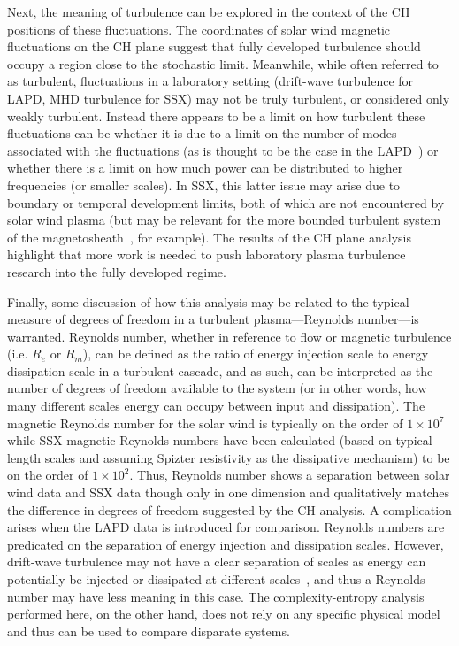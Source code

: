 \documentclass[aps,prx,twocolumn,secnumarabic,nobalancelastpage,amsmath,amssymb,
nofootinbib]{revtex4-1}
\begin{document}
Next, the meaning of turbulence can be explored in the context of the CH positions of these fluctuations. The coordinates of solar wind magnetic fluctuations on the CH plane suggest that fully developed turbulence should occupy a region close to the stochastic limit. Meanwhile, while often referred to as turbulent, fluctuations in a laboratory setting (drift-wave turbulence for LAPD, MHD turbulence for SSX) may not be truly turbulent, or considered only weakly turbulent. Instead there appears to be a limit on how turbulent these fluctuations can be whether it is due to a limit on the number of modes associated with the fluctuations (as is thought to be the case in the LAPD~\cite{maggs2013}) or whether there is a limit on how much power can be distributed to higher frequencies (or smaller scales). In SSX, this latter issue may arise due to boundary or temporal development limits, both of which are not encountered by solar wind plasma (but may be relevant for the more bounded turbulent system of the magnetosheath~\cite{SahraouiPRL2006,YordanovaPRL2008}, for example). The results of the CH plane analysis highlight that more work is needed to push laboratory plasma turbulence research into the fully developed regime.
 
Finally, some discussion of how this analysis may be related to the typical measure of degrees of freedom in a turbulent plasma---Reynolds number---is warranted. Reynolds number, whether in reference to flow or magnetic turbulence (i.e. $R_e$ or $R_{m}$), can be defined as the ratio of energy injection scale to energy dissipation scale in a turbulent cascade, and as such, can be interpreted as the number of degrees of freedom available to the system (or in other words, how many different scales energy can occupy between input and dissipation). The magnetic Reynolds number for the solar wind is typically on the order of $1 \times 10^7$ while SSX magnetic Reynolds numbers have been calculated (based on typical length scales and assuming Spizter resistivity as the dissipative mechanism) to be on the order of $1 \times 10^2$. Thus, Reynolds number shows a separation between solar wind data and SSX data though only in one dimension and qualitatively matches the difference in degrees of freedom suggested by the CH analysis. A complication arises when the LAPD data is introduced for comparison. Reynolds numbers are predicated on the separation of energy injection and dissipation scales. However, drift-wave turbulence may not have a clear separation of scales as energy can potentially be injected or dissipated at different scales~\cite{friedman2012}, and thus a Reynolds number may have less meaning in this case. The complexity-entropy analysis performed here, on the other hand, does not rely on any specific physical model and thus can be used to compare disparate systems.
\end{document}
